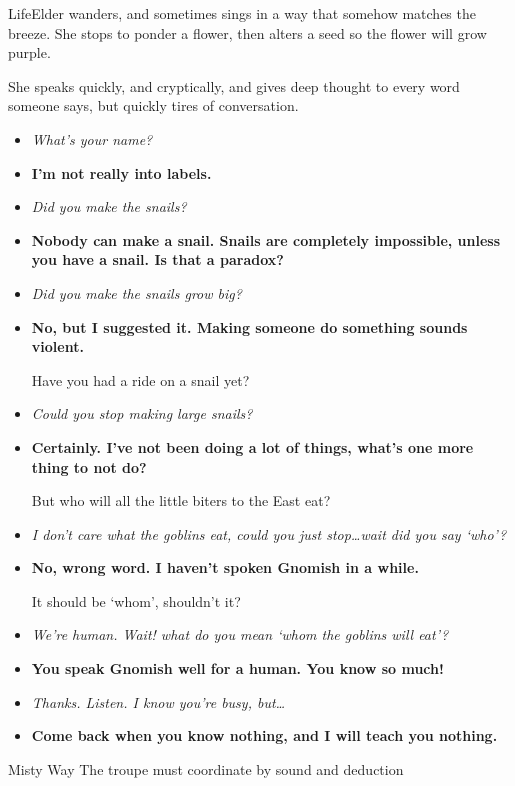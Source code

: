 \begin{multicols}{2}
\Gls{LifeElder} wanders, and sometimes sings in a way that somehow matches the breeze.
She stops to ponder a flower, then alters a seed so the flower will grow purple.

She speaks quickly, and cryptically, and gives deep thought to every word someone says, but quickly tires of conversation.

\begin{itemize}
  \item\it
  What's your name?
  \item[\adforn{54}]\bf
  I'm not really into labels.
  \item\it
  Did you make the snails?
  \item[\adforn{54}]\bf
  Nobody can make a snail.
  Snails are completely impossible, unless you have a snail.
  Is that a paradox?
  \item\it
  Did you make the snails grow big?
  \item[\adforn{54}]\bf
  No, but I suggested it.
  Making someone do something sounds violent.

  Have you had a ride on a snail yet?
  \item\it
  Could you stop making large snails?
  \item[\adforn{54}]\bf
  Certainly.
  I've not been doing a lot of things, what's one more thing to not do?

  But who will all the little biters to the East eat?
  \item\it
  I don't care what the goblins eat, could you just stop\ldots wait did you say `who'?
  \item[\adforn{54}]\bf
  No, wrong word.
  I haven't spoken Gnomish in a while.

  It should be `whom', shouldn't it?
  \item\it
  We're human.
  Wait! what do you mean `whom the goblins will eat'?
  \item[\adforn{54}]\bf
  You speak Gnomish well for a human.
  You know so much!
  \item\it
  Thanks.
  Listen.
  I know you're busy, but\ldots
  \item[\adforn{54}]\bf
  Come back when you know nothing, and I will teach you nothing.
\end{itemize}

\LifeElder

\showStdSpells

{Misty Way}%
{The troupe must coordinate by sound and deduction}%


\end{multicols}
